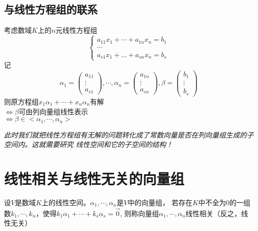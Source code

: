 \subsection*{与线性方程组的联系}
考虑数域$K$上的$n$元线性方程组
\begin{equation*}
    \begin{cases}
        a_{11}x_1+\cdots+a_{1n}x_n=b_{1}\\
        \cdots\\
        a_{s1}x_1+\dots+a_{sn}x_n=b_{s}
    \end{cases}
\end{equation*}
记
\begin{equation*}
    \alpha_1 = \begin{pmatrix}
        a_{11}\\ \vdots \\ a_{s1}
    \end{pmatrix}
    , \cdots, 
    \alpha_n = \begin{pmatrix}
        a_{1n}\\ \vdots \\ a_{sn}
    \end{pmatrix},
    \beta = \begin{pmatrix}
        b_1 \\ \vdots \\ b_s
    \end{pmatrix}
\end{equation*}
则原方程组$x_1\alpha_1 + \cdots + x_n\alpha_n$有解\\
$\Leftrightarrow$$\beta$可由列向量组线性表示\\
$\Leftrightarrow$$\beta \in <\alpha_1, \cdots, \alpha_n>$

\emph{此时我们就把线性方程组有无解的问题转化成了常数向量是否在列向量组生成的子空间内。这就需要研究
线性空间和它的子空间的结构！}

\section{线性相关与线性无关的向量组}

\begin{definition}[线性相关，无关]
    设$V$是数域$K$上的线性空间。$\alpha_1, \cdots, \alpha_n$是$V$中的向量组，
    若存在$K$中不全为$0$的一组数$k_1, \cdots, k_n$，使得$k_1\alpha_1 + \cdots + k_s\alpha_s = \vec{0}$,
    则称向量组$\alpha_1, \cdots, \alpha_n$线性相关（反之，线性无关）
\end{definition}

